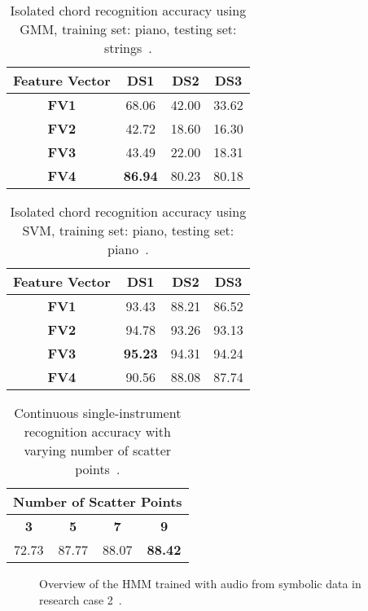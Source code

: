 \documentclass{sig-alternate}
\begin{document}
\begin{table}[h]
\centering
\begin{tabular}{|c|c|c|c|} \hline
\textbf{Feature Vector} & \textbf{DS1} & \textbf{DS2} & \textbf{DS3} \\ \hline
\textbf{FV1} & 68.06 & 42.00 & 33.62 \\ \hline
\textbf{FV2} & 42.72 & 18.60 & 16.30 \\ \hline
\textbf{FV3} & 43.49 & 22.00 & 18.31 \\ \hline
\textbf{FV4} & \textbf{86.94} & 80.23 & 80.18 \\ \hline
\end{tabular}
\caption{Isolated chord recognition accuracy using GMM, training set: piano, testing set: strings~\cite{Morman:2006}.}
\label{tab:tab4}
\end{table}

\begin{table}[h]
\centering
\begin{tabular}{|c|c|c|c|} \hline
\textbf{Feature Vector} & \textbf{DS1} & \textbf{DS2} & \textbf{DS3} \\ \hline
\textbf{FV1} & 93.43 & 88.21 & 86.52 \\ \hline
\textbf{FV2} & 94.78 & 93.26 & 93.13 \\ \hline
\textbf{FV3} & \textbf{95.23} & 94.31 & 94.24 \\ \hline
\textbf{FV4} & 90.56 & 88.08 & 87.74 \\ \hline
\end{tabular}
\caption{Isolated chord recognition accuracy using SVM, training set: piano, testing set: piano~\cite{Morman:2006}.}
\label{tab:tab7}
\end{table}

\begin{table}[h]
\centering
\begin{tabular}{|c|c|c|c|} \hline
\multicolumn{4}{|c|}{\textbf{Number of Scatter Points}} \\ \hline
\textbf{3} & \textbf{5} & \textbf{7} & \textbf{9} \\ \hline
72.73 & 87.77 & 88.07 & \textbf{88.42} \\ \hline
\end{tabular}
\caption{Continuous single-instrument recognition accuracy with varying number of scatter points~\cite{Morman:2006}.}
\label{tab:tab8}
\end{table}

\begin{figure}[h]
\centering
{}
\caption{Overview of the HMM trained with audio from symbolic data in research case 2~\cite{Lee:2006}.}
\label{fig:fig1}
\end{figure}
\end{document}
